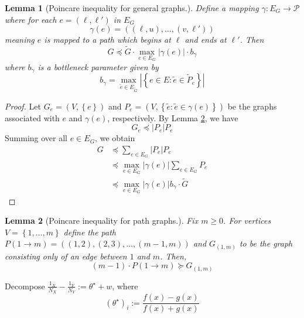 \documentclass{article}
\newcommand{\abs}[1]{\left \lvert #1 \right \rvert}
\newcommand{\set}[1]{\left\{#1\right\}}
\newcommand{\1}{\mathbb{I}}
\theoremstyle{alden}
\theoremstyle{aldenthm}
\newtheorem{lemma}{Lemma}
\theoremstyle{definition}
\theoremstyle{remark}
\begin{document}
\begin{lemma}[Poincare inequality for general graphs.]
	Define a mapping $\gamma: E_G \to \mathcal{P}$ where for each $e = (\ell,\ell')$ in $E_G$
	\begin{equation*}
	\gamma(e) = ((\ell,u), \ldots, (v,\ell'))
	\end{equation*}
	meaning $e$ is mapped to a path which begins at $\ell$ and ends at $\ell'$. Then
	\begin{equation*}
	G \preceq \widetilde{G} \cdot \max_{e \in E_G} \abs{\gamma(e)}  \cdot b_{\gamma}
	\end{equation*}
	where $b_{\gamma}$ is a bottleneck parameter given by
	\begin{equation*}
	b_{\gamma} = \max_{\widetilde{e} \in E_{\widetilde{G}}} \abs{\set{e \in E: \widetilde{e} \in \widetilde{P}_e}}
	\end{equation*}
\end{lemma}
\begin{proof}
	Let $G_e = (V, \set{e})$ and $P_e = (V, \set{\widetilde{e}: \widetilde{e} \in \gamma(e)})$ be the graphs associated with $e$ and $\gamma(e)$, respectively. By Lemma \ref{lem: path_poincare}, we have
	\begin{equation*}
	G_{e} \preceq \abs{P_e} P_e
	\end{equation*}
	Summing over all $e \in E_G$, we obtain
	\begin{align*}
	G & \preceq \sum_{e \in E_G} \abs{P_e} P_e \\
	& \preceq \max_{e \in E_G} \abs{\gamma(e)} \sum_{e \in E_G} P_e \\
	& \preceq \max_{e \in E_G} \abs{\gamma(e)} b_{\gamma}\cdot \widetilde{G}
	\end{align*}
\end{proof}

\begin{lemma}[Poincare inequality for path graphs.]
	\label{lem: path_poincare}
	Fix $m \geq 0$. For vertices $V = \set{1, \ldots,m}$ define the path $P(1 \to m) = ((1,2),(2,3),\ldots, (m-1,m))$ and $G_{(1,m)}$ to be the graph consisting only of an edge between $1$ and $m$. Then,
	\begin{equation*}
	(m - 1) \cdot P(1 \to m) \succeq G_{(1,m)}
	\end{equation*}
\end{lemma}

Decompose $\frac{1_X}{N_X} - \frac{1_Y}{N_Y} := \theta^{\star} + w$, where
\begin{equation*}
(\theta^{\star})_i := \frac{f(x) - g(x)}{f(x) + g(x)}
\end{equation*}
\end{document}

